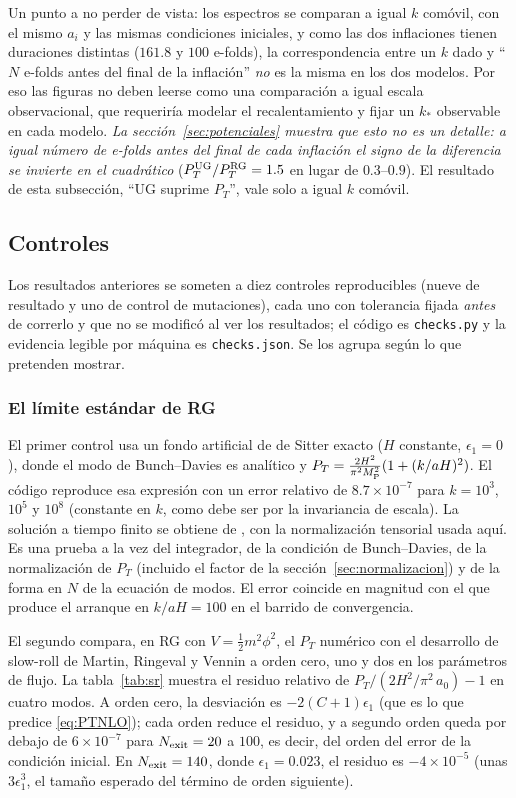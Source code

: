 Un punto a no perder de vista: los espectros se comparan a igual $k$ comóvil, con el mismo $a_i$ y las mismas condiciones iniciales, y como las dos inflaciones tienen duraciones distintas ($161.8$ y $100$ e-folds), la correspondencia entre un $k$ dado y ``$N$ e-folds antes del final de la inflación'' \emph{no} es la misma en los dos modelos. Por eso las figuras no deben leerse como una comparación a igual escala observacional, que requeriría modelar el recalentamiento y fijar un $k_*$ observable en cada modelo. \emph{La sección~\ref{sec:potenciales} muestra que esto no es un detalle: a igual número de e-folds antes del final de cada inflación el signo de la diferencia se invierte en el cuadrático} ($P_T^{\rm UG}/P_T^{\rm RG}=1.5$ en lugar de $0.3$--$0.9$). El resultado de esta subsección, ``UG suprime $P_T$'', vale solo a igual $k$ comóvil.

\subsection{Controles}

Los resultados anteriores se someten a diez controles reproducibles (nueve de resultado y uno de control de mutaciones), cada uno con tolerancia fijada \emph{antes} de correrlo y que no se modificó al ver los resultados; el código es \texttt{checks.py} y la evidencia legible por máquina es \texttt{checks.json}. Se los agrupa según lo que pretenden mostrar.

\subsubsection{El límite estándar de RG}

El primer control usa un fondo artificial de de Sitter exacto ($H$ constante, $\epsilon_1=0$), donde el modo de Bunch--Davies es analítico y $P_T=\frac{2H^2}{\pi^2M_{\rm P}^2}(1+(k/aH)^2)$. El código reproduce esa expresión con un error relativo de $8.7\times10^{-7}$ para $k=10^3$, $10^5$ y $10^8$ (constante en $k$, como debe ser por la invariancia de escala). La solución a tiempo finito se obtiene de \cite[ecs.~196 y 198]{baumann22}, con la normalización tensorial usada aquí. Es una prueba a la vez del integrador, de la condición de Bunch--Davies, de la normalización de $P_T$ (incluido el factor de la sección~\ref{sec:normalizacion}) y de la forma en $N$ de la ecuación de modos. El error coincide en magnitud con el que produce el arranque en $k/aH=100$ en el barrido de convergencia.

El segundo compara, en RG con $V=\tfrac12m^2\phi^2$, el $P_T$ numérico con el desarrollo de slow-roll de Martin, Ringeval y Vennin \cite{martin14} a orden cero, uno y dos en los parámetros de flujo. La tabla~\ref{tab:sr} muestra el residuo relativo de $P_T/(2H^2/\pi^2\,a_0)-1$ en cuatro modos. A orden cero, la desviación es $-2(C+1)\epsilon_1$ (que es lo que predice \eqref{eq:PTNLO}); cada orden reduce el residuo, y a segundo orden queda por debajo de $6\times10^{-7}$ para $N_{\rm exit}=20$ a $100$, es decir, del orden del error de la condición inicial. En $N_{\rm exit}=140$, donde $\epsilon_1=0.023$, el residuo es $-4\times10^{-5}$ (unas $3\epsilon_1^3$, el tamaño esperado del término de orden siguiente).

